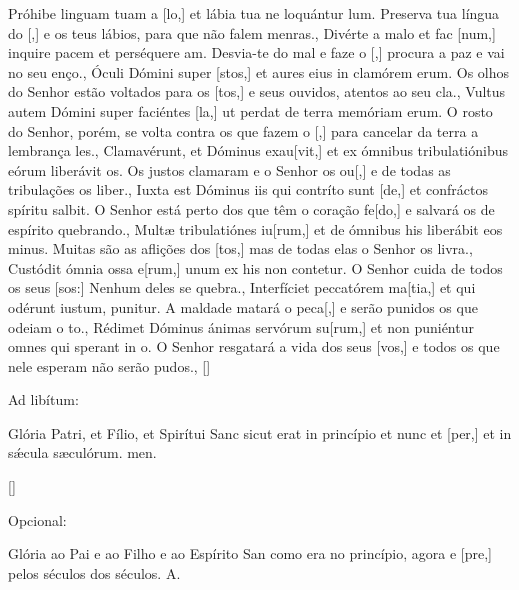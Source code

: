 {  {Próhibe linguam tuam a [lo,] et lábia tua ne lo\-quántur \-lum.}%
    {Preserva tua língua do [,] e os teus lábios, para que não falem menras.},
  {Divérte a malo et fac [num,] inquire pacem et perséquere am.}%
    {Desvia-te do mal e faze o [,] procura a paz e vai no seu enço.},
  {Óculi Dómini super [stos,] et aures eius in clamórem erum.}%
    {Os olhos do Senhor estão voltados para os [tos,] e seus ouvidos, atentos ao seu cla.},
  {Vultus autem Dómini super faciéntes [la,] ut perdat de ter\-ra memóriam erum.}%
    {O rosto do Senhor, porém, se volta contra os que fazem o [,] para cancelar da terra a lembrança les.},
  {Clamavérunt, et Dóminus exau[vit,] et ex ómnibus tribulatiónibus eórum liberávit os.}%
    {Os justos clamaram e o Senhor os ou[,] e de todas as tribulações os liber.},
  {Iuxta est Dóminus iis qui contríto sunt [de,] et confráctos spíritu salbit.}%
    {O Senhor está perto dos que têm o coração fe[do,] e salvará os de espírito quebrando.},
  {Multæ tribulatiónes iu[rum,] et de ómnibus his liberábit eos minus.}%
    {Muitas são as aflições dos [tos,] mas de todas elas o Senhor os livra.},
  {Custódit ómnia ossa e[rum,] unum ex his non contetur.}%
    {O Senhor cuida de todos os seus [sos:] Nenhum deles se quebra.},
  {Interfíciet peccatórem ma[tia,] et qui odérunt iustum, puni\-tur.}%
    {A maldade matará o peca[,] e serão punidos os que odeiam o to.},
  {Rédimet Dóminus ánimas servórum su[rum,] et non puniéntur omnes qui sperant in o.}%
    {O Senhor resgatará a vida dos seus [vos,] e todos os que nele esperam não serão pudos.},
  []{\begin{rubrica}Ad libítum:\end{rubrica} Glória Patri, et Fílio, et Spirítui Sanc sicut erat in princípio et nunc et [per,] et in sǽcula sæculórum. men.}%
    []{\begin{rubrica}Opcional:\end{rubrica} Glória ao Pai e ao Filho e ao Espírito San como era no princípio, agora e [pre,] pelos séculos dos séculos. A.}
}